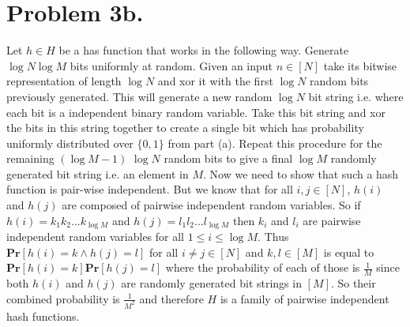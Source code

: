 \documentclass[12pt]{article}
\begin{document}
\section*{Problem 3b.} Let $h \in H$ be a has function that works in the following
way. Generate $\log N \log M$ bits uniformly at random. Given an input
$n \in [N]$ take its bitwise representation of length $\log N$ and xor it with
the first $\log N$ random bits previously generated. This will generate a new
random $\log N$ bit string i.e. where each bit is a independent binary random
variable. Take this bit string and xor the bits in this string together to
create a single bit which has probability uniformly distributed over $\{0,1\}$
from part (a). Repeat this procedure for the remaining $(\log M - 1)$ $\log N$
random bits to give a final $\log M$ randomly generated bit string i.e. an
element in $M$. Now we need to show that such a hash function is pair-wise
independent. But we know that for all $i,j \in [N]$, $h(i)$ and $h(j)$ are
composed of pairwise independent random variables. So if
$h(i) = k_1k_2...k_{\log M}$ and $h(j) = l_1l_2...l_{\log M}$ then $k_i$ and
$l_i$ are pairwise independent random variables for all $1 \le i \le \log M$.
Thus $\textbf{Pr}[h(i) = k \wedge h(j) = l]$ for all $i \neq j \in [N]$ and
$k,l \in [M]$ is equal to $\textbf{Pr}[h(i) = k]\textbf{Pr}[h(j) = l]$ where the
probability of each of those is $\frac{1}{M}$ since both $h(i)$ and $h(j)$
are randomly generated bit strings in $[M]$. So their combined probability is
$\frac{1}{M^2}$ and therefore $H$ is a family of pairwise independent hash
functions.

\newpage
\end{document}
